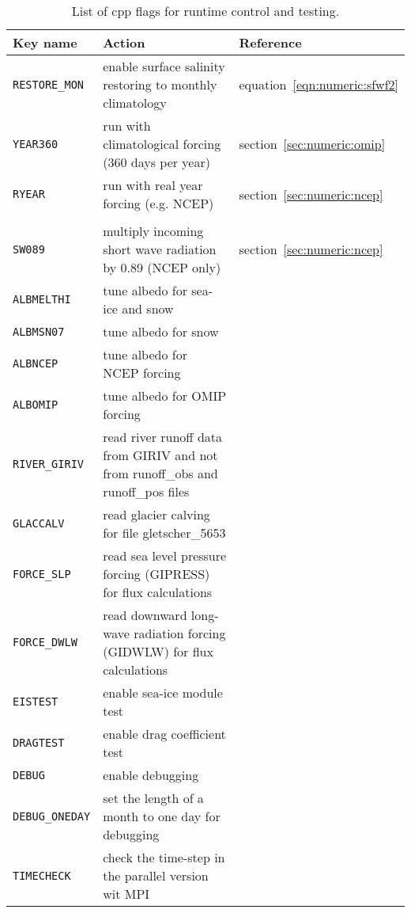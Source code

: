 \begin{table}[ht]
\begin{footnotesize}
        \begin{tabular}[t]{l|p{8cm}|l}
          Key name &
          Action &
	  Reference \\
        \hline	
         \texttt{RESTORE\_MON} &
           enable surface salinity restoring to monthly climatology &
           equation~\ref{eqn:numeric:sfwf2}\\	
         \texttt{YEAR360} &
           run with climatological forcing (360 days per year) &   	  		
           section~\ref{sec:numeric:omip}\\	
         \texttt{RYEAR} &
           run with real year forcing (e.g. NCEP) &   	 	  		
           section~\ref{sec:numeric:ncep}\\		
        \\
         \texttt{SW089} &
            multiply incoming short wave radiation by 0.89 (NCEP only) &
            section~\ref{sec:numeric:ncep} \\
         \texttt{ALBMELTHI} &
            tune albedo for sea-ice and snow &
        \\
         \texttt{ALBMSN07} &
            tune albedo for snow  &
        \\
         \texttt{ALBNCEP} &
            tune albedo for NCEP forcing  &
        \\
         \texttt{ALBOMIP} &
            tune albedo for OMIP forcing  &
        \\
         \texttt{RIVER\_GIRIV} &
            read river runoff data from GIRIV and not from runoff\_obs and runoff\_pos files  &
        \\
         \texttt{GLACCALV} &
            read glacier calving for file gletscher\_5653  &
        \\
         \texttt{FORCE\_SLP} &
            read sea level pressure forcing (GIPRESS) for flux calculations   &
        \\
         \texttt{FORCE\_DWLW} &
            read downward long-wave radiation forcing (GIDWLW) for flux calculations   &
        \\
         \texttt{EISTEST} &
            enable sea-ice module test  &
        \\
         \texttt{DRAGTEST} &
            enable drag coefficient test   &
        \\
         \texttt{DEBUG} &
            enable debugging   &
        \\
         \texttt{DEBUG\_ONEDAY} &
            set the length of a month to one day for debugging  &
        \\
         \texttt{TIMECHECK} &
            check the time-step in the parallel version wit MPI   &
        \\
        \end{tabular}
\end{footnotesize}
\caption[List of cpp flags for runtime control and testing]{List of cpp flags for runtime control and testing.}
\label{tb:using:cpp-flags-run}
\end{table}



